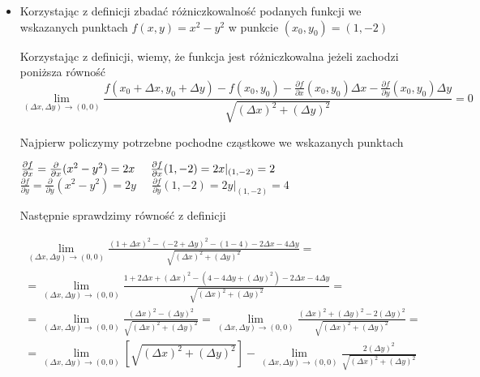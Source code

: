 \documentclass[main.tex]{subfiles}
\begin{document}
\begin{itemize}
        \item Korzystając z definicji zbadać różniczkowalność podanych funkcji we wskazanych punktach \newline
        $f(x,y) = x^2 - y^2$
        w punkcie $(x_0, y_0) = (1, -2)$

        Korzystając z definicji, wiemy, że funkcja jest różniczkowalna jeżeli zachodzi poniższa równość
        \begin{equation}
            \lim_{(\Delta x, \Delta y) \rightarrow (0,0)} \frac{f(x_0 + \Delta x, y_0 + \Delta y) - f(x_0, y_0) - \frac{\partial f}{\partial x} (x_0, y_0) \Delta x - \frac{\partial f}{\partial y} (x_0, y_0) \Delta y}{\sqrt{(\Delta x)^2 + (\Delta y)^2}} = 0
        \end{equation}

        Najpierw policzymy potrzebne pochodne cząstkowe we wskazanych punktach\newline

        $\frac{\partial f}{\partial x} = \frac{\partial }{\partial x} (x^2 - y^2) = 2x \; \; \; \; \; \frac{\partial f}{\partial x} (1,-2) = 2x | _{(1,-2)} = 2 \\$ \newline
        $\frac{\partial f}{\partial y} = \frac{\partial}{\partial y} (x^2 - y^2) = 2y \; \; \; \; \; \frac{\partial f}{\partial y} (1, -2) = 2y | _{(1,-2)} = 4$

        Następnie sprawdzimy równość z definicji

        \begin{equation}
            \begin{aligned}
                \lim_{(\Delta x, \Delta y) \rightarrow (0,0)} \frac{(1 + \Delta x)^2 - (-2 + \Delta y)^2 - (1 - 4) - 2 \Delta x - 4 \Delta y }{\sqrt{(\Delta x)^2 + (\Delta y)^2}} = \\
                = \lim_{(\Delta x, \Delta y) \rightarrow (0,0)} \frac{1 + 2 \Delta x + (\Delta x)^2 - (4 - 4 \Delta y + (\Delta y)^2) - 2 \Delta x - 4 \Delta y}{ \sqrt{(\Delta x)^2 + (\Delta y)^2}} = \\
                = \lim_{(\Delta x, \Delta y) \rightarrow (0,0)} \frac{(\Delta x)^2 - (\Delta y)^2}{\sqrt{(\Delta x)^2 + (\Delta y)^2}} = \lim_{(\Delta x, \Delta y) \rightarrow (0,0)} \frac{(\Delta x)^2 + (\Delta y)^2 - 2(\Delta y)^2}{\sqrt{(\Delta x)^2 + (\Delta y)^2}} = \\
                = \lim_{(\Delta x, \Delta y) \rightarrow (0,0)} \left[ \sqrt{(\Delta x)^2 + (\Delta y)^2} \right] - \lim_{(\Delta x, \Delta y) \rightarrow (0,0)} \frac{2(\Delta y)^2}{\sqrt{(\Delta x)^2 + (\Delta y)^2}} \\
            \end{aligned}
        \end{equation}


\end{itemize}
\end{document}
